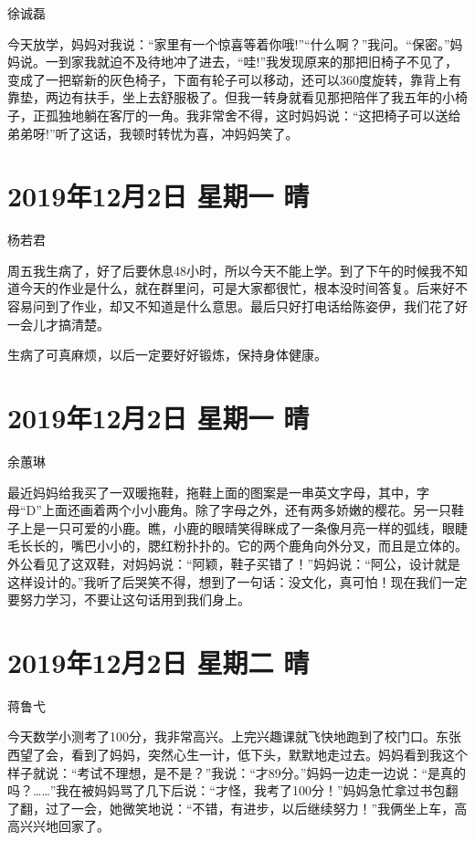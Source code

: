 徐诚磊

今天放学，妈妈对我说：``家里有一个惊喜等着你哦!''``什么啊？''我问。``保密。''妈妈说。一到家我就迫不及待地冲了进去，``哇!''我发现原来的那把旧椅子不见了，变成了一把崭新的灰色椅子，下面有轮子可以移动，还可以360度旋转，靠背上有靠垫，两边有扶手，坐上去舒服极了。但我一转身就看见那把陪伴了我五年的小椅子，正孤独地躺在客厅的一角。我非常舍不得，这时妈妈说：``这把椅子可以送给弟弟呀!''听了这话，我顿时转忧为喜，冲妈妈笑了。

\section{2019年12月2日 星期一 晴}

杨若君

周五我生病了，好了后要休息48小时，所以今天不能上学。到了下午的时候我不知道今天的作业是什么，就在群里问，可是大家都很忙，根本没时间答复。后来好不容易问到了作业，却又不知道是什么意思。最后只好打电话给陈姿伊，我们花了好一会儿才搞清楚。

生病了可真麻烦，以后一定要好好锻炼，保持身体健康。

\section{2019年12月2日 星期一 晴}

余蕙琳

最近妈妈给我买了一双暖拖鞋，拖鞋上面的图案是一串英文字母，其中，字母``D''上面还画着两个小小鹿角。除了字母之外，还有两多娇嫩的樱花。另一只鞋子上是一只可爱的小鹿。瞧，小鹿的眼晴笑得眯成了一条像月亮一样的弧线，眼睫毛长长的，嘴巴小小的，腮红粉扑扑的。它的两个鹿角向外分叉，而且是立体的。外公看见了这双鞋，对妈妈说：``阿颖，鞋子买错了！''妈妈说：``阿公，设计就是这样设计的。''我听了后哭笑不得，想到了一句话：没文化，真可怕！现在我们一定要努力学习，不要让这句话用到我们身上。

\section{2019年12月2日 星期二 晴}

蒋鲁弋

今天数学小测考了100分，我非常高兴。上完兴趣课就飞快地跑到了校门口。东张西望了会，看到了妈妈，突然心生一计，低下头，默默地走过去。妈妈看到我这个样子就说：``考试不理想，是不是？''我说：``才89分。''妈妈一边走一边说：``是真的吗？\ldots\ldots{}''我在被妈妈骂了几下后说：``才怪，我考了100分！''妈妈急忙拿过书包翻了翻，过了一会，她微笑地说：``不错，有进步，以后继续努力！''我俩坐上车，高高兴兴地回家了。

